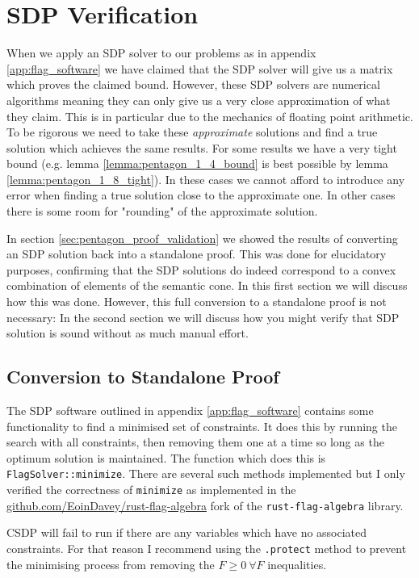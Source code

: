 \chapter{SDP Verification}
\label{app:sdp_verification}

When we apply an SDP solver to our problems as in appendix \ref{app:flag_software}
we have claimed that the SDP solver will give us a matrix which proves the claimed bound.
However, these SDP solvers are numerical algorithms meaning they can only give us a very
close approximation of what they claim. This is in particular due to the mechanics of
floating point arithmetic. To be rigorous we need to take these \textit{approximate}
solutions and find a true solution which achieves the same results.
For some results we have a very tight bound (e.g. lemma \ref{lemma:pentagon_1_4_bound}
is best possible by lemma \ref{lemma:pentagon_1_8_tight}). In these cases we cannot afford
to introduce any error when finding a true solution close to the approximate one. In
other cases there is some room for "rounding" of the approximate solution.

In section \ref{sec:pentagon_proof_validation} we showed the results of converting an
SDP solution back into a standalone proof. This was done for elucidatory purposes,
confirming that the SDP solutions do indeed correspond to a convex combination of elements
of the semantic cone. In this first section we will discuss how this was done.
However, this full conversion to a standalone proof is not necessary: In the second
section we will discuss how you might verify that SDP solution is sound without as much
manual effort.

\section*{Conversion to Standalone Proof}

The SDP software outlined in appendix \ref{app:flag_software} contains some
functionality to find a minimised set of constraints. It does this by
running the search with all constraints, then removing them one at a time so long as
the optimum solution is maintained. The function which does this is
\verb|FlagSolver::minimize|. There are several such methods implemented but I
only verified the correctness of \verb|minimize| as implemented in the
\url{github.com/EoinDavey/rust-flag-algebra} fork of the \verb|rust-flag-algebra|
library.

\begin{note*}
    CSDP will fail to run if there are any variables which have no associated constraints.
    For that reason I recommend using the \verb|.protect| method to prevent the minimising
    process from removing the $F \geq 0\ \forall F$ inequalities.
\end{note*}

